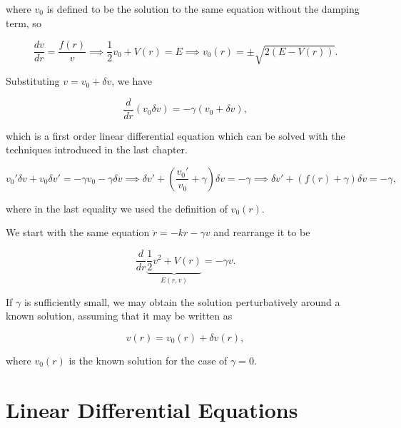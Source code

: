 \documentclass[english,a4paper,12pt]{report}
\begin{document}
where \(v_0 \) is defined to be the solution to the same equation without the damping term, so

\begin{equation}
    \frac{dv}{dr} = \frac{f(r)}{v} \implies \frac{1}{2} v_0  + V(r) = E \implies v_0 (r) = \pm \sqrt{2(E-V(r))} .  
\end{equation}

Substituting \(v = v_0  + \delta v\), we have 

\begin{equation}
    \frac{d}{dr}(v_0 \delta v) = -\gamma (v_0 +\delta v), 
\end{equation}

which is a first order linear differential equation which can be solved with the techniques introduced in the last chapter.

\begin{equation}
    v_0 '\delta v + v_0  \delta v' = -\gamma v_0 -\gamma \delta v \implies \delta v' + \left( \frac{v_0 '}{v_0 } + \gamma  \right) \delta v = -\gamma  \implies \delta v' + (f(r) + \gamma )\delta v = -\gamma,
\end{equation}

where in the last equality we used the definition of \(v_0 (r)\). 










{}
{We start with the same equation \(\ddot{r} = -kr-\gamma v \) and rearrange it to be

\begin{equation}
    \frac{d}{dr}\underbrace{\frac{1}{2}v^2+V(r) }_{E(r,v)} = -\gamma v. 
\end{equation}

If \(\gamma \) is sufficiently small, we may obtain the solution perturbatively around a known solution, assuming that it may be written as 

\begin{equation}
    v(r) = v_0 (r) + \delta v(r),
\end{equation}

where \(v_0 (r)\) is the known solution for the case of \(\gamma  = 0\).   

}  


\chapter{Linear Differential Equations} \label{linear} 
\end{document}
